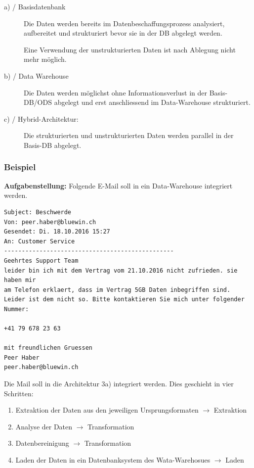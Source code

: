 \documentclass[a4paper, 11pt]{article}
\begin{document}
\begin{description}
	\item[a) / Basisdatenbank] Die Daten werden bereits im Datenbeschaffungsprozess analysiert, aufbereitet und strukturiert bevor sie in der DB abgelegt werden. 
	
	Eine Verwendung der unstrukturierten Daten ist nach Ablegung nicht mehr möglich.
	\item[b) / Data Warehouse] Die Daten werden möglichst ohne Informationsverlust in der Basis-DB/ODS abgelegt und erst anschliessend im Data-Warehouse strukturiert.
	\item[c) / Hybrid-Architektur: ] Die strukturierten und unstrukturierten Daten werden parallel in der Basis-DB abgelegt.
\end{description}

\newpage

\subsubsection{Beispiel}
\textbf{Aufgabenstellung: } Folgende E-Mail soll in ein Data-Warehouse integriert werden.

\begin{lstlisting}
Subject: Beschwerde
Von: peer.haber@bluewin.ch
Gesendet: Di. 18.10.2016 15:27
An: Customer Service
------------------------------------------------
Geehrtes Support Team
leider bin ich mit dem Vertrag vom 21.10.2016 nicht zufrieden. sie haben mir 
am Telefon erklaert, dass im Vertrag 5GB Daten inbegriffen sind. 
Leider ist dem nicht so. Bitte kontaktieren Sie mich unter folgender Nummer:

+41 79 678 23 63

mit freundlichen Gruessen
Peer Haber
peer.haber@bluewin.ch

\end{lstlisting}

Die Mail soll in die Architektur 3a) integriert werden. Dies geschieht in vier Schritten:

\begin{enumerate}
	\item Extraktion der Daten aus den jeweiligen Ursprungsformaten $\rightarrow$ Extraktion
	\item Analyse der Daten $\rightarrow$ Transformation
	\item Datenbereinigung $\rightarrow$ Transformation
	\item Laden der Daten in ein Datenbanksystem des Wata-Warehosues $\rightarrow$ Laden
\end{enumerate}
\end{document}
